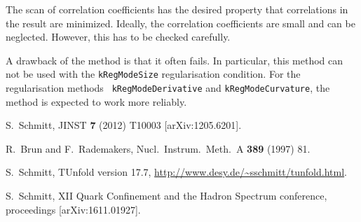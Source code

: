 \documentclass[12pt]{article}
\newcommand{\tunfoldmajor}{17}
\newcommand{\tunfoldminor}{7}
\newcommand{\tunfoldversion}{{\tunfoldmajor{}.\tunfoldminor}}
\begin{document}
The scan of correlation coefficients has the desired property that
correlations in the result are minimized. Ideally, the correlation
coefficients are small and can be neglected. However, this has to be
checked carefully.

A drawback of the method is that it often fails. In particular, this
method can not be used with the {\tt kRegModeSize}
regularisation condition. For the regularisation methods {\tt
  kRegModeDerivative} and {\tt kRegModeCurvature}, the method is
expected to work more reliably.


\begin{flushleft}
\begin{thebibliography}{99}

  S.~Schmitt,
  JINST {\bf 7} (2012) T10003
  [arXiv:1205.6201].

  R.~Brun and F.~Rademakers,
  Nucl.\ Instrum.\ Meth.\  A {\bf 389} (1997) 81.

S.~Schmitt, TUnfold version \tunfoldversion, 
\url{http://www.desy.de/~sschmitt/tunfold.html}.

S.~Schmitt, XII Quark Confinement and the Hadron
Spectrum conference, proceedings [arXiv:1611.01927].

\end{thebibliography}
\end{flushleft}
\end{document}
